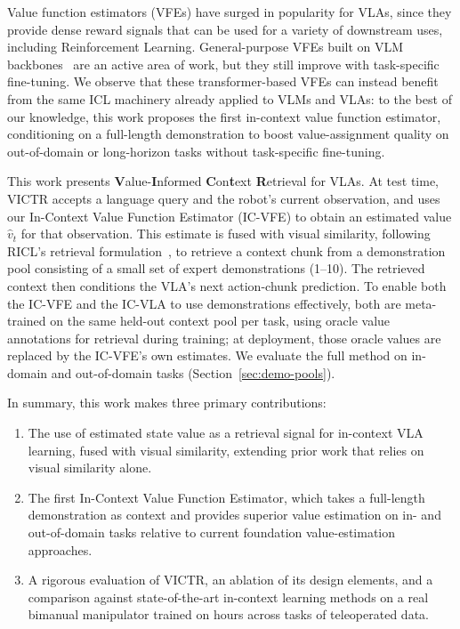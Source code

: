 \documentclass[conference]{IEEEtran}
\newcommand{\method}{VICTR\xspace}
\begin{document}
Value function estimators (VFEs) have surged in popularity for VLAs, since
they provide dense reward signals that can be used for a variety of downstream uses, including Reinforcement Learning. 
General-purpose VFEs built on VLM backbones~\cite{robometer,topreward,sarm} are an active area of work, but they still improve with task-specific fine-tuning.
We observe that these transformer-based VFEs can instead benefit from the same ICL machinery already applied to VLMs and VLAs: to the best of our knowledge, this work
proposes the first in-context value function estimator, conditioning on a
full-length demonstration to boost value-assignment quality on
out-of-domain or long-horizon tasks without task-specific fine-tuning.


This work presents \textbf{V}alue-\textbf{I}nformed \textbf{C}on\textbf{t}ext \textbf{R}etrieval for VLAs. At test time, \method accepts a language query
and the robot's current observation, and uses our
In-Context Value Function Estimator (IC-VFE) to obtain an estimated value
$\hat v_t$ for that observation. 
This estimate is fused with visual similarity, following RICL's retrieval formulation~\cite{ricl}, to retrieve a context chunk from a demonstration pool consisting of a small set of expert demonstrations (1--10). The retrieved context then conditions the VLA's next action-chunk prediction. To enable both the IC-VFE and the
IC-VLA to use demonstrations effectively, both are meta-trained on the same
held-out context pool per task, using oracle value annotations for retrieval
during training; at deployment, those oracle values are replaced by the
IC-VFE's own estimates. We evaluate the full method on \NumTaskPairs{} in-domain and \NumTaskPairs{}
out-of-domain tasks (Section~\ref{sec:demo-pools}).

In summary, this work makes three primary contributions:
\begin{enumerate}
    \item The use of estimated state value as a retrieval signal for
    in-context VLA learning, fused with visual similarity, extending prior work that relies on visual
    similarity alone.
    
    \item The first In-Context Value Function Estimator, which takes a full-length demonstration as context and provides superior value estimation on in- and out-of-domain tasks relative to current foundation
    value-estimation approaches.

    \item A rigorous evaluation of \method, an ablation of its design elements, and a comparison against state-of-the-art in-context learning methods on a real bimanual manipulator trained on \NumTrainHours{} hours
    across \NumTasks{} tasks of teleoperated data.
\end{enumerate}
\end{document}
